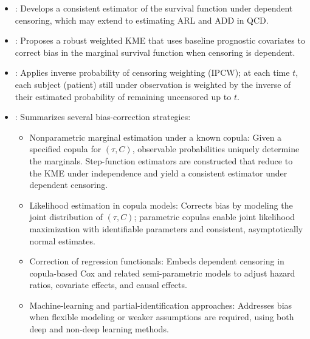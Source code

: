 \documentclass{article}
\theoremstyle{plain}
\theoremstyle{definition}
\theoremstyle{remark}
\begin{document}
\begin{itemize}
    \item \citep{ebrahimi2003survival}: Develops a consistent estimator of the survival function under dependent censoring, which may extend to estimating ARL and ADD in QCD.
    \item \citep{hsu2010robust}: Proposes a robust weighted KME that uses baseline prognostic covariates to correct bias in the marginal survival function when censoring is dependent.
    \item \citep{lin2023informative}: Applies inverse probability of censoring weighting (IPCW); at each time $t$, each subject (patient) still under observation is weighted by the inverse of their estimated probability of remaining uncensored up to $t$.
    \item \citep{crommen2025recent}: Summarizes several bias-correction strategies:
        \begin{itemize}
            \item Nonparametric marginal estimation under a known copula: Given a specified copula for $(\tau, C)$, observable probabilities uniquely determine the marginals. Step-function estimators are constructed that reduce to the KME under independence and yield a consistent estimator under dependent censoring.
            \item Likelihood estimation in copula models: Corrects bias by modeling the joint distribution of $(\tau, C)$; parametric copulas enable joint likelihood maximization with identifiable parameters and consistent, asymptotically normal estimates.
            \item Correction of regression functionals: Embeds dependent censoring in copula-based Cox and related semi-parametric models to adjust hazard ratios, covariate effects, and causal effects.
            \item Machine-learning and partial-identification approaches: Addresses bias when flexible modeling or weaker assumptions are required, using both deep and non-deep learning methods.
        \end{itemize}
\end{itemize}

\end{document}
